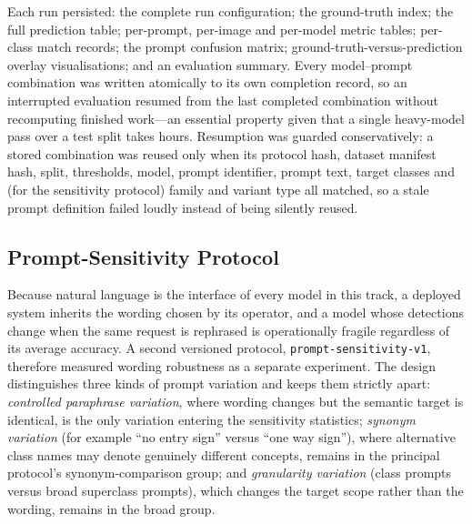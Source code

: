 Each run persisted: the complete run configuration; the ground-truth index; the full prediction table; per-prompt, per-image and per-model metric tables; per-class match records; the prompt confusion matrix; ground-truth-versus-prediction overlay visualisations; and an evaluation summary. Every model--prompt combination was written atomically to its own completion record, so an interrupted evaluation resumed from the last completed combination without recomputing finished work---an essential property given that a single heavy-model pass over a test split takes hours. Resumption was guarded conservatively: a stored combination was reused only when its protocol hash, dataset manifest hash, split, thresholds, model, prompt identifier, prompt text, target classes and (for the sensitivity protocol) family and variant type all matched, so a stale prompt definition failed loudly instead of being silently reused.

\subsection{Prompt-Sensitivity Protocol}
\label{subsec:prompt-sensitivity}

Because natural language is the interface of every model in this track, a deployed system inherits the wording chosen by its operator, and a model whose detections change when the same request is rephrased is operationally fragile regardless of its average accuracy. A second versioned protocol, \texttt{prompt-sensitivity-v1}, therefore measured wording robustness as a separate experiment. The design distinguishes three kinds of prompt variation and keeps them strictly apart: \emph{controlled paraphrase variation}, where wording changes but the semantic target is identical, is the only variation entering the sensitivity statistics; \emph{synonym variation} (for example ``no entry sign'' versus ``one way sign''), where alternative class names may denote genuinely different concepts, remains in the principal protocol's synonym-comparison group; and \emph{granularity variation} (class prompts versus broad superclass prompts), which changes the target scope rather than the wording, remains in the broad group.

